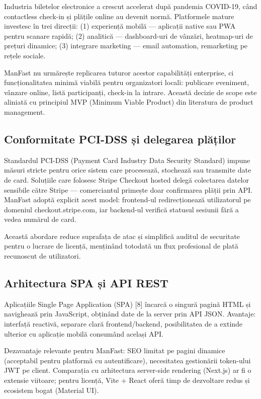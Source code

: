 Industria biletelor electronice a crescut accelerat după pandemia COVID-19, când contactless check-in și plățile online au devenit normă. Platformele mature investesc în trei direcții: (1) experiență mobilă — aplicații native sau PWA pentru scanare rapidă; (2) analitică — dashboard-uri de vânzări, heatmap-uri de prețuri dinamice; (3) integrare marketing — email automation, remarketing pe rețele sociale.

ManFast nu urmărește replicarea tuturor acestor capabilități enterprise, ci funcționalitatea minimă viabilă pentru organizatori locali: publicare eveniment, vânzare online, listă participanți, check-in la intrare. Această decizie de scope este aliniată cu principiul MVP (Minimum Viable Product) din literatura de product management.

\subsection{Conformitate PCI-DSS și delegarea plăților}

Standardul PCI-DSS (Payment Card Industry Data Security Standard) impune măsuri stricte pentru orice sistem care procesează, stochează sau transmite date de card. Soluțiile care folosesc Stripe Checkout hosted delegă colectarea datelor sensibile către Stripe — comerciantul primește doar confirmarea plății prin API. ManFast adoptă explicit acest model: frontend-ul redirecționează utilizatorul pe domeniul checkout.stripe.com, iar backend-ul verifică statusul sesiunii fără a vedea numărul de card.

Această abordare reduce suprafața de atac și simplifică auditul de securitate pentru o lucrare de licență, menținând totodată un flux profesional de plată recunoscut de utilizatori.

\subsection{Arhitectura SPA și API REST}

Aplicațiile Single Page Application (SPA) [8] încarcă o singură pagină HTML și navighează prin JavaScript, obținând date de la server prin API JSON. Avantaje: interfață reactivă, separare clară frontend/backend, posibilitatea de a extinde ulterior cu aplicație mobilă consumând același API.

Dezavantaje relevante pentru ManFast: SEO limitat pe pagini dinamice (acceptabil pentru platformă cu autentificare), necesitatea gestionării token-ului JWT pe client. Comparația cu arhitectura server-side rendering (Next.js) ar fi o extensie viitoare; pentru licență, Vite + React oferă timp de dezvoltare redus și ecosistem bogat (Material UI).

